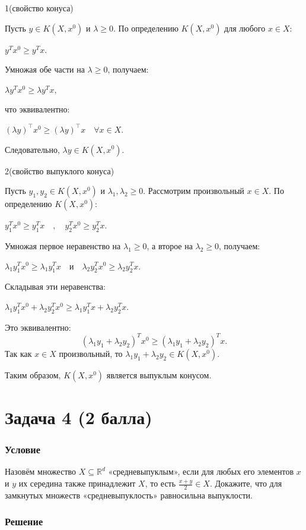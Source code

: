 \documentclass[10pt]{article}
\begin{document}
1(свойство конуса)

Пусть $y \in K(X, x^0)$ и $\lambda \geq 0$. По определению $K(X, x^0)$ для любого $x \in X$:

$y^T x^0 \geq y^T x.$

Умножая обе части на $\lambda \geq 0$, получаем:

$\lambda y^T x^0 \geq \lambda y^T x,$

что эквивалентно:

$(\lambda y)^\top x^0 \geq (\lambda y)^\top x \quad \forall x \in X.$

Следовательно, $\lambda y \in K(X, x^0)$.

2(свойство выпуклого конуса)

Пусть $y_1, y_2 \in K(X, x^0)$ и $\lambda_1, \lambda_2 \geq 0$. Рассмотрим произвольный $x \in X$. По определению $K(X, x^0)$:

$y_1^T x^0 \geq y_1^T x \quad, \quad y_2^T x^0 \geq y_2^T x.$

Умножая первое неравенство на $\lambda_1 \geq 0$, а второе на $\lambda_2 \geq 0$, получаем:

$\lambda_1 y_1^T x^0 \geq \lambda_1 y_1^T x \quad \text{и} \quad \lambda_2 y_2^T x^0 \geq \lambda_2 y_2^T x.$

Складывая эти неравенства:

$\lambda_1 y_1^T x^0 + \lambda_2 y_2^T x^0 \geq \lambda_1 y_1^T x + \lambda_2 y_2^T x.$

Это эквивалентно:
$$
(\lambda_1 y_1 + \lambda_2 y_2)^T x^0 \geq (\lambda_1 y_1 + \lambda_2 y_2)^T x.
$$
Так как $x \in X$ произвольный, то $\lambda_1 y_1 + \lambda_2 y_2 \in K(X, x^0)$.

Таким образом, $K(X, x^0)$ является выпуклым конусом.

\section{Задача 4 (2 балла)}

\subsubsection{Условие}

Назовём множество $X \subseteq \mathbb{R}^{d}$ «средневыпуклым», если для любых его элементов $x$ и $y$ их середина также принадлежит $X$, то есть $\frac{x+y}{2} \in X$. Докажите, что для замкнутых множеств «средневыпуклость» равносильна выпуклости.

\subsubsection{Решение}
\end{document}
